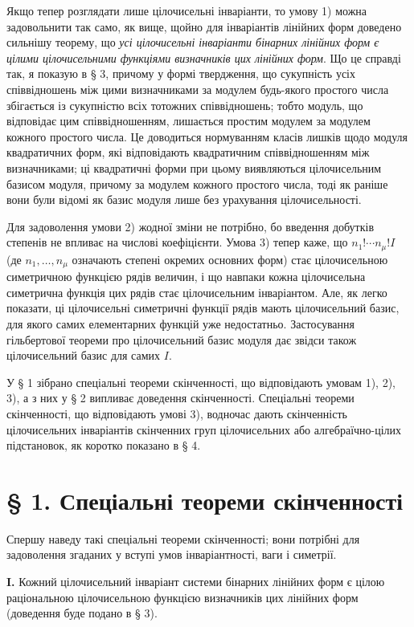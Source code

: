 \documentclass[11pt]{article}
\begin{document}
Якщо тепер розглядати лише цілочисельні інваріанти, то умову 1) можна задовольнити так само, як вище, щойно для інваріантів лінійних форм доведено сильнішу теорему, що \emph{усі цілочисельні інваріанти бінарних лінійних форм є цілими цілочисельними функціями визначників цих лінійних форм}. Що це справді так, я показую в § 3, причому у формі твердження, що сукупність усіх співвідношень між цими визначниками за модулем будь-якого простого числа збігається із сукупністю всіх тотожних співвідношень; тобто модуль, що відповідає цим співвідношенням, лишається простим модулем за модулем кожного простого числа. Це доводиться нормуванням класів лишків щодо модуля квадратичних форм, які відповідають квадратичним співвідношенням між визначниками; ці квадратичні форми при цьому виявляються цілочисельним базисом модуля, причому за модулем кожного простого числа, тоді як раніше вони були відомі як базис модуля лише без урахування цілочисельності.

Для задоволення умови 2) жодної зміни не потрібно, бо введення добутків степенів не впливає на числові коефіцієнти. Умова 3) тепер каже, що \(n_1!\cdots n_\mu! I\) (де \(n_1,\ldots,n_\mu\) означають степені окремих основних форм) стає цілочисельною симетричною функцією рядів величин, і що навпаки кожна цілочисельна симетрична функція цих рядів стає цілочисельним інваріантом. Але, як легко показати, ці цілочисельні симетричні функції рядів мають цілочисельний базис, для якого самих елементарних функцій уже недостатньо. Застосування гільбертової теореми про цілочисельний базис модуля дає звідси також цілочисельний базис для самих \(I\).

У § 1 зібрано спеціальні теореми скінченності, що відповідають умовам 1), 2), 3), а з них у § 2 випливає доведення скінченності. Спеціальні теореми скінченності, що відповідають умові 3), водночас дають скінченність цілочисельних інваріантів скінченних груп цілочисельних або алгебраїчно-цілих підстановок, як коротко показано в § 4.

\section*{§ 1. Спеціальні теореми скінченності}

Спершу наведу такі спеціальні теореми скінченності; вони потрібні для задоволення згаданих у вступі умов інваріантності, ваги і симетрії.

\textbf{I.} Кожний цілочисельний інваріант системи бінарних лінійних форм є цілою раціональною цілочисельною функцією визначників цих лінійних форм (доведення буде подано в § 3).
\end{document}
